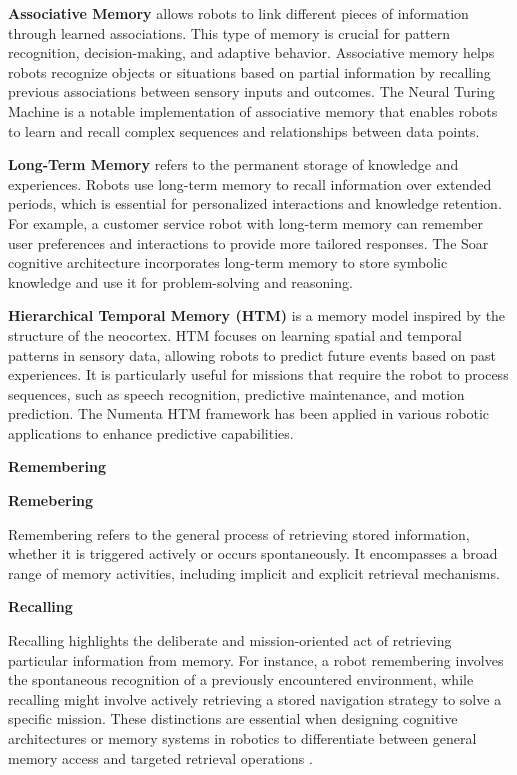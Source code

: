 \documentclass{book}
\providecommand{\ProjectDeepHeading}[2]{%
    \par\medskip\noindent\textbf{#2}\par\smallskip
}
\begin{document}
        \textbf{Associative Memory} allows robots to link different pieces of information through learned associations. This type of memory is crucial for pattern recognition, decision-making, and adaptive behavior. Associative memory helps robots recognize objects or situations based on partial information by recalling previous associations between sensory inputs and outcomes. The Neural Turing Machine is a notable implementation of associative memory that enables robots to learn and recall complex sequences and relationships between data points.
    
        \textbf{Long-Term Memory} refers to the permanent storage of knowledge and experiences. Robots use long-term memory to recall information over extended periods, which is essential for personalized interactions and knowledge retention. For example, a customer service robot with long-term memory can remember user preferences and interactions to provide more tailored responses. The Soar cognitive architecture incorporates long-term memory to store symbolic knowledge and use it for problem-solving and reasoning.
    
        \textbf{Hierarchical Temporal Memory (HTM)} is a memory model inspired by the structure of the neocortex. HTM focuses on learning spatial and temporal patterns in sensory data, allowing robots to predict future events based on past experiences. It is particularly useful for missions that require the robot to process sequences, such as speech recognition, predictive maintenance, and motion prediction. The Numenta HTM framework has been applied in various robotic applications to enhance predictive capabilities.



\ProjectDeepHeading{5}{Remembering}
    \ProjectDeepHeading{8}{Remebering}
        Remembering refers to the general process of retrieving stored information, whether it is triggered actively or occurs spontaneously. It encompasses a broad range of memory activities, including implicit and explicit retrieval mechanisms. 
        
    \ProjectDeepHeading{8}{Recalling}
     Recalling highlights the deliberate and mission-oriented act of retrieving particular information from memory. For instance, a robot remembering involves the spontaneous recognition of a previously encountered environment, while recalling might involve actively retrieving a stored navigation strategy to solve a specific mission. These distinctions are essential when designing cognitive architectures or memory systems in robotics to differentiate between general memory access and targeted retrieval operations .
\end{document}
